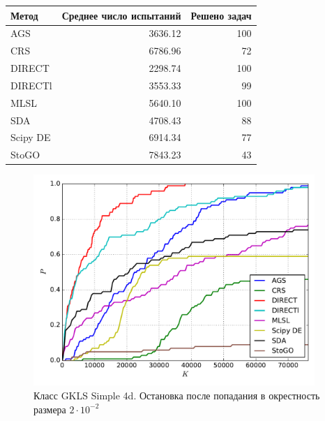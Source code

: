 \documentclass[a4paper]{article}
\begin{document}
\begin{tabular}{lrr}
\hline
 Метод    &   Среднее число испытаний &   Решено задач \\
\hline
 AGS      &                   3636.12 &            100 \\
 CRS      &                   6786.96 &             72 \\
 DIRECT   &                   2298.74 &            100 \\
 DIRECTl  &                   3553.33 &             99 \\
 MLSL     &                   5640.10 &            100 \\
 SDA      &                   4708.43 &             88 \\
 Scipy DE &                   6914.34 &             77 \\
 StoGO    &                   7843.23 &             43 \\
\hline
\end{tabular}
\begin{figure}[H]
  \center
  \includegraphics[width=0.95\textwidth]{../experiments/gklss4d/cmc.pdf}
  \caption{Класс GKLS Simple 4d. Остановка после попадания в окрестность размера $2\cdot10^{-2}$}
  \label{fig:}
\end{figure}
\end{document}
